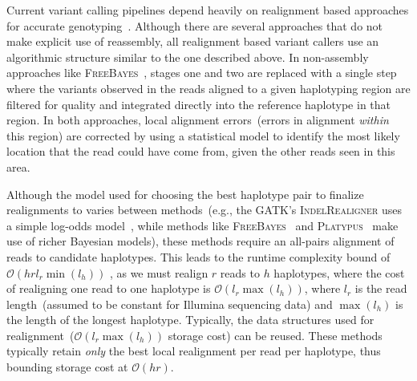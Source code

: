 \documentclass{bioinfo}
\begin{document}
Current variant calling pipelines depend heavily on realignment based approaches for accurate
genotyping~\citep{li14}. Although there are several approaches that do not make explicit use of reassembly,
all realignment based variant callers use an algorithmic structure similar to the one described
above. In non-assembly approaches like \textsc{FreeBayes}~\citep{garrison12}, stages
one and two are replaced with a single step where the variants observed in the reads aligned to a given
haplotyping region are filtered for quality and integrated directly into the reference haplotype in that region.
In both approaches, local alignment errors~(errors in alignment \emph{within} this region) are corrected
by using a statistical model to identify the most likely location that the read could have come from, given
the other reads seen in this area.

Although the model used for choosing the best haplotype pair to finalize realignments to varies between
methods~(e.g., the GATK's \textsc{IndelRealigner} uses a simple log-odds model~\citep{depristo11}, while
methods like \textsc{FreeBayes}~\citep{garrison12} and \textsc{Platypus}~\citep{rimmer14} make use of richer
Bayesian models), these methods require an all-pairs alignment of reads to candidate
haplotypes. This leads to the runtime complexity bound of $\mathcal{O}(h r l_r \min(l_h))$
, as we must realign $r$ reads to $h$ haplotypes, where the cost of realigning
one read to one haplotype is $\mathcal{O}(l_r \max(l_h))$, where $l_r$ is the read length~(assumed to be
constant for Illumina sequencing data) and $\max(l_h)$ is the length of the longest haplotype. Typically,
the data structures used for realignment~($\mathcal{O}(l_r \max(l_h))$ storage cost) can be reused.
These methods typically retain \emph{only} the best local realignment per read per haplotype, thus
bounding storage cost at $\mathcal{O}(h r)$.
\end{document}
